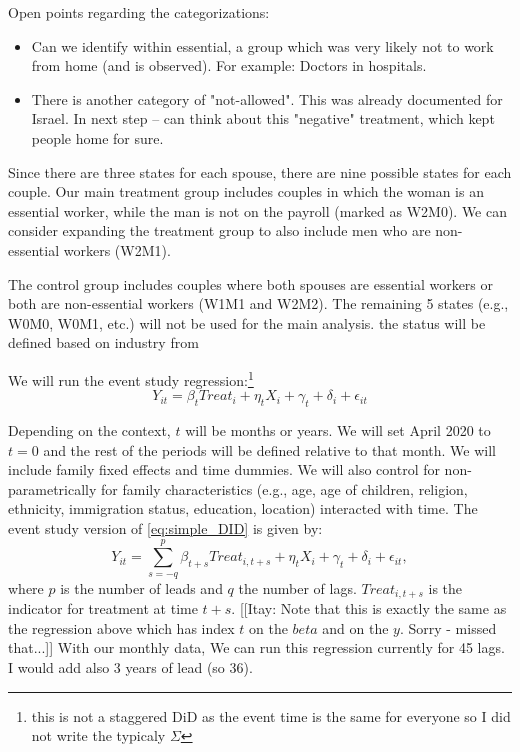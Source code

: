 \documentclass{article}
\begin{document}
Open points regarding the categorizations:
\begin{itemize}
    \item Can we identify within essential, a group which was very likely not to work from home (and is observed). For example: Doctors in hospitals. 
    \item There is another category of "not-allowed". This was already documented for Israel. In next step -- can think about this "negative" treatment, which kept people home for sure.  
\end{itemize}

Since there are three states for each spouse, there are nine possible states for each couple. Our main treatment group includes couples in which the woman is an essential worker, while the man is not on the payroll (marked as W2M0). We can consider expanding the treatment group to also include men who are non-essential workers (W2M1). 

The control group includes couples where both spouses are essential workers or both are non-essential workers (W1M1 and W2M2). The remaining 5 states (e.g., W0M0, W0M1, etc.) will not be used for the main analysis. 
the status will be defined based on industry from 


We will run the event study regression:\footnote{this is not a staggered DiD as the event time is the same for everyone so I did not write the typicaly $\Sigma$} 
\begin{equation} \label{eq:simple_DID}
Y_{it}=\beta_tTreat_i+\eta_t X_{i}+\gamma_t+\delta_i+\epsilon_{it}
\end{equation}

Depending on the context, $t$ will be months or years. We will set April 2020 to $t=0$ and the rest of the periods will be defined relative to that month. We will include family fixed effects and time dummies. We will also control for non-parametrically for family characteristics (e.g., age, age of children, religion, ethnicity, immigration status, education, location) interacted with time. 
The event study version of \eqref{eq:simple_DID} is given by:
\begin{equation} \label{eq:simple_event}
Y_{it}=\sum_{s=-q}^{p}\beta_{t+s}Treat_{i,t+s}+\eta_t X_{i}+\gamma_t+\delta_i+\epsilon_{it},
\end{equation}
where $p$ is the number of leads and $q$ the number of lags. $Treat_{i,t+s}$ is the indicator for treatment at time $t+s$. [[Itay: Note that this is exactly the same as the regression above which has index $t$ on the $beta$ and on the $y$. Sorry - missed that...]]
With our monthly data, We can run this regression currently for 45 lags. I would add also 3 years of lead (so 36). 
\end{document}
